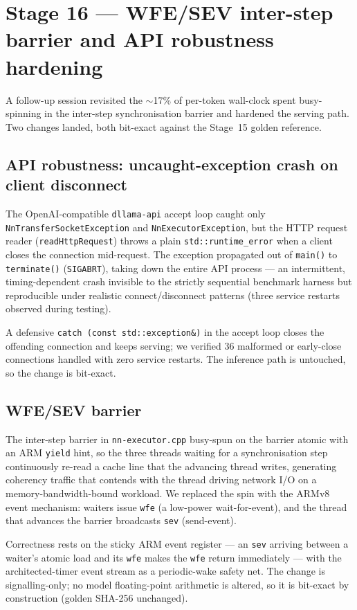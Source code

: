 \documentclass[10pt,a4paper]{article}
\begin{document}
\section{Stage 16 --- WFE/SEV inter-step barrier and API robustness hardening}
\label{sec:stage16}

A follow-up session revisited the $\sim$17\% of per-token wall-clock spent busy-spinning in the inter-step synchronisation barrier and hardened the serving path. Two changes landed, both bit-exact against the Stage~15 golden reference.

\subsection{API robustness: uncaught-exception crash on client disconnect}
The OpenAI-compatible \texttt{dllama-api} accept loop caught only \texttt{NnTransferSocketException} and \texttt{NnExecutorException}, but the HTTP request reader (\texttt{readHttpRequest}) throws a plain \texttt{std::runtime\_error} when a client closes the connection mid-request. The exception propagated out of \texttt{main()} to \texttt{terminate()} (\texttt{SIGABRT}), taking down the entire API process --- an intermittent, timing-dependent crash invisible to the strictly sequential benchmark harness but reproducible under realistic connect/disconnect patterns (three service restarts observed during testing).

A defensive \texttt{catch (const std::exception\&)} in the accept loop closes the offending connection and keeps serving; we verified 36 malformed or early-close connections handled with zero service restarts. The inference path is untouched, so the change is bit-exact.

\subsection{WFE/SEV barrier}
The inter-step barrier in \texttt{nn-executor.cpp} busy-spun on the barrier atomic with an ARM \texttt{yield} hint, so the three threads waiting for a synchronisation step continuously re-read a cache line that the advancing thread writes, generating coherency traffic that contends with the thread driving network I/O on a memory-bandwidth-bound workload. We replaced the spin with the ARMv8 event mechanism: waiters issue \texttt{wfe} (a low-power wait-for-event), and the thread that advances the barrier broadcasts \texttt{sev} (send-event).

Correctness rests on the sticky ARM event register --- an \texttt{sev} arriving between a waiter's atomic load and its \texttt{wfe} makes the \texttt{wfe} return immediately --- with the architected-timer event stream as a periodic-wake safety net. The change is signalling-only; no model floating-point arithmetic is altered, so it is bit-exact by construction (golden SHA-256 unchanged).
\end{document}
